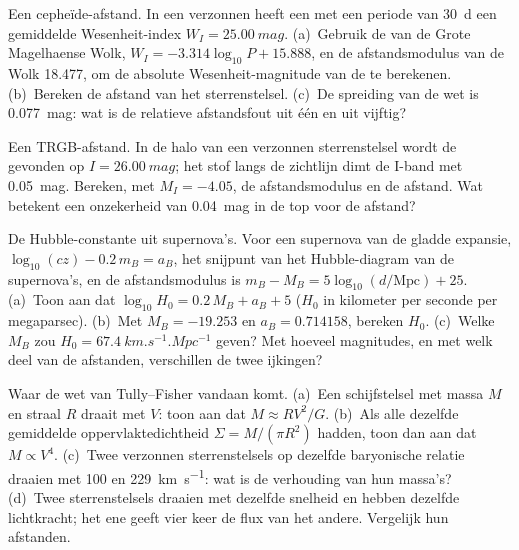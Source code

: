 \begin{exercise}[$\star\star$]\label{exo:b3:milky-way-galaxies:7}
Een cepheïde-afstand. In een verzonnen  heeft een  met een periode van
\qty{30}{d} een gemiddelde Wesenheit-index $W_I = \qty{25.00}{mag}$.
(a)~Gebruik de  van de Grote Magelhaense Wolk,
$W_I = -3.314\log_{10}P + 15.888$, en de afstandsmodulus van de Wolk
18.477, om de absolute Wesenheit-magnitude van de  te berekenen. (b)~Bereken
de afstand van het sterrenstelsel. (c)~De spreiding van de wet is \qty{0.077}{mag}: wat is
de relatieve afstandsfout uit één  en uit vijftig?
\end{exercise}

\begin{exercise}[$\star\star$]\label{exo:b3:milky-way-galaxies:8}
Een TRGB-afstand. In de halo van een verzonnen sterrenstelsel wordt de  gevonden op $I = \qty{26.00}{mag}$; het stof langs de
zichtlijn dimt de I-band met \qty{0.05}{mag}. Bereken, met $M_I = -4.05$, de
afstandsmodulus en de afstand. Wat betekent een onzekerheid van
\qty{0.04}{mag} in de top voor de afstand?
\end{exercise}

\begin{exercise}[$\star\star$]\label{exo:b3:milky-way-galaxies:9}
De Hubble-constante uit supernova's. Voor een supernova van de gladde
expansie, $\log_{10}(cz) - 0.2\,m_B = a_B$, het snijpunt van het
Hubble-diagram van de supernova's, en de afstandsmodulus is
$m_B - M_B = 5\log_{10}(d/\mathrm{Mpc}) + 25$. (a)~Toon aan dat
$\log_{10}H_0 = 0.2\,M_B + a_B + 5$ ($H_0$ in kilometer per seconde per
megaparsec). (b)~Met $M_B = -19.253$ en $a_B = 0.714158$, bereken $H_0$.
(c)~Welke $M_B$ zou $H_0 = \qty{67.4}{km.s^{-1}.Mpc^{-1}}$ geven? Met hoeveel
magnitudes, en met welk deel van de afstanden, verschillen de twee
ijkingen?
\end{exercise}

\begin{exercise}[$\star\star\star$]\label{exo:b3:milky-way-galaxies:10}
Waar de wet van Tully--Fisher vandaan komt. (a)~Een schijfstelsel met massa $M$
en straal $R$ draait met $V$: toon aan dat $M \approx RV^2/G$. (b)~Als alle
 dezelfde gemiddelde oppervlaktedichtheid $\Sigma = M/(\pi R^2)$ hadden,
toon dan aan dat $M \propto V^4$. (c)~Twee verzonnen sterrenstelsels op dezelfde baryonische
relatie draaien met 100 en \qty{229}{km.s^{-1}}: wat is de verhouding van
hun massa's? (d)~Twee sterrenstelsels draaien met dezelfde snelheid en hebben dezelfde
lichtkracht; het ene geeft vier keer de flux van het andere. Vergelijk hun
afstanden.
\end{exercise}

